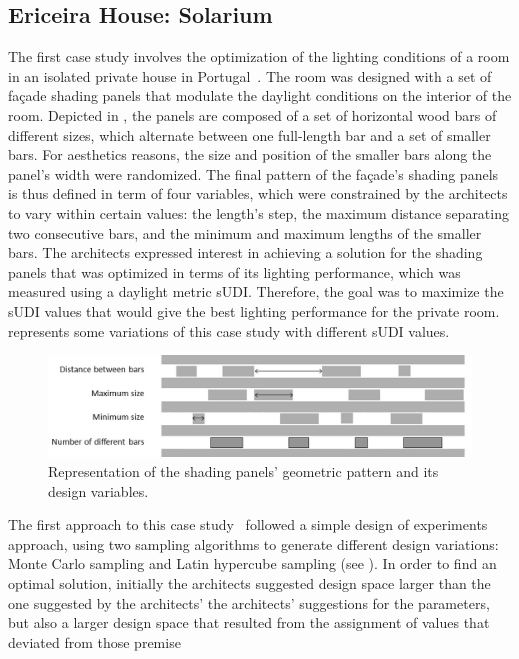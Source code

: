 \subsection{Ericeira House: Solarium}

The first case study involves the optimization of the lighting conditions of a room in an isolated private house in Portugal~\cite{Caetano2018,Belem2018optimizeddesign}. The room was designed with a set of façade shading panels that modulate the daylight conditions on the interior of the room. Depicted in , the panels are composed of a set of horizontal wood bars of different sizes, which alternate between one full-length bar and a set of smaller bars. For aesthetics reasons, the size and position of the smaller bars along the panel's width were randomized. The final pattern of the façade's shading panels is thus defined in term of four variables, which were constrained by the architects to vary within certain values: the length’s step, the maximum distance separating two consecutive bars, and the minimum and maximum lengths of the smaller bars. The architects expressed interest in achieving a solution for the shading panels that was optimized in terms of its lighting performance, which was measured using a daylight metric \ac{sUDI}. Therefore, the goal was to maximize the \ac{sUDI} values that would give the best lighting performance for the private room.  represents some variations of this case study with different \ac{sUDI} values.

\begin{figure}[htbp]
	\centering
	\includegraphics[width=\textwidth]{Images/Evaluation/Ericeira_1.jpg}
	\caption{Representation of the shading panels' geometric pattern and its design variables.}
	\label{fig:ericeira_panels_explanation}
\end{figure}
The first approach to this case study~\cite{Caetano2018} followed a simple design of experiments approach, using two sampling algorithms to generate different design variations: Monte Carlo sampling and Latin hypercube sampling (see ). In order to find an optimal solution, initially the architects suggested 
design space larger than the one suggested by the architects' the architects’ suggestions for the parameters, but also a larger design space that resulted from the assignment of values that deviated from those premise

